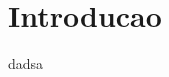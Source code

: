\documentclass[12pt,openany, oneside, a4paper,brazil]{abntex2}
\begin{document}
\imprimircapa
\imprimirfolhaderosto{}



\listoffigures*
\cleardoublepage
\listoftables*
\cleardoublepage


\tableofcontents*

\textual

\chapter*{Introducao}
dadsa\cite{gu2008botminer}

\postextual

\end{document}
